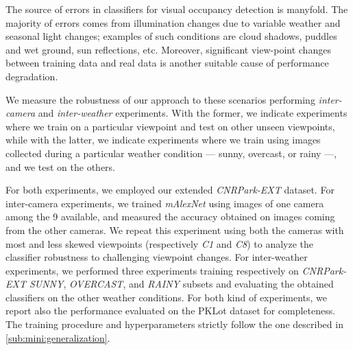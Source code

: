 The source of errors in classifiers for visual occupancy detection is manyfold.
The majority of errors comes from illumination changes due to variable weather and seasonal light changes;
examples of such conditions are cloud shadows, puddles and wet ground, sun reflections, etc.
Moreover, significant view-point changes between training data and real data is another suitable cause of performance degradation.

We measure the robustness of our approach to these scenarios performing \emph{inter-camera} and \emph{inter-weather} experiments.
With the former, we indicate experiments where we train on a particular viewpoint and test on other unseen viewpoints, while with the latter, we indicate experiments where we train using images collected during a particular weather condition --- sunny, overcast, or rainy ---, and we test on the others.

For both experiments, we employed our extended \emph{CNRPark-EXT} dataset.
For inter-camera experiments, we trained \emph{mAlexNet} using images of one camera among the 9 available, and measured the accuracy obtained on images coming from the other cameras.
We repeat this experiment using both the cameras with most and less skewed viewpoints (respectively \emph{C1} and \emph{C8}) to analyze the classifier robustness to challenging viewpoint changes.
For inter-weather experiments, we performed three experiments training respectively on \emph{CNRPark-EXT SUNNY}, \emph{OVERCAST}, and \emph{RAINY} subsets and evaluating the obtained classifiers on the other weather conditions.
For both kind of experiments, we report also the performance evaluated on the PKLot dataset for completeness.
The training procedure and hyperparameters strictly follow the one described in \ref{sub:mini:generalization}.


